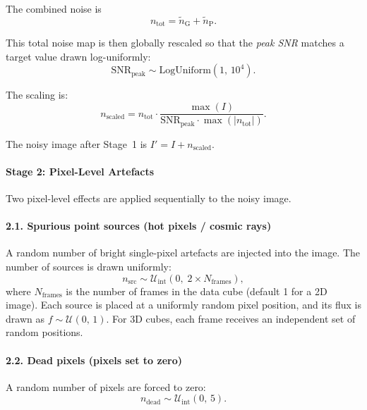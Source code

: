 \documentclass{aa}
\begin{document}
The combined noise is
\begin{equation}
n_\mathrm{tot} = \tilde{n}_\mathrm{G} + \tilde{n}_\mathrm{P}.
\end{equation}

This total noise map is then globally rescaled so that the \emph{peak SNR} matches a target value drawn log-uniformly:
\begin{equation}
\mathrm{SNR}_\mathrm{peak} \sim \mathrm{LogUniform}(1,\,10^4).
\end{equation}

The scaling is:
\begin{equation}
n_\mathrm{scaled} = n_\mathrm{tot} \cdot \frac{\max(I)}{\mathrm{SNR}_\mathrm{peak} \cdot \max(|n_\mathrm{tot}|)}.
\end{equation}

The noisy image after Stage~1 is $I' = I + n_\mathrm{scaled}$.

\paragraph{Stage 2: Pixel-Level Artefacts}

Two pixel-level effects are applied sequentially to the noisy image.

\paragraph{2.1. Spurious point sources (hot pixels / cosmic rays)}

A random number of bright single-pixel artefacts are injected into the image. The number of sources is drawn uniformly:
\begin{equation}
n_\mathrm{src} \sim \mathcal{U}_\mathrm{int}\!\left(0,\; 2 \times N_\mathrm{frames}\right),
\end{equation}
where $N_\mathrm{frames}$ is the number of frames in the data cube (default 1 for a 2D image). Each source is placed at a uniformly random pixel position, and its flux is drawn as $f \sim \mathcal{U}(0,\,1)$. For 3D cubes, each frame receives an independent set of random positions.

\paragraph{2.2. Dead pixels (pixels set to zero)}

A random number of pixels are forced to zero:
\begin{equation}
n_\mathrm{dead} \sim \mathcal{U}_\mathrm{int}(0,\,5).
\end{equation}
\end{document}
